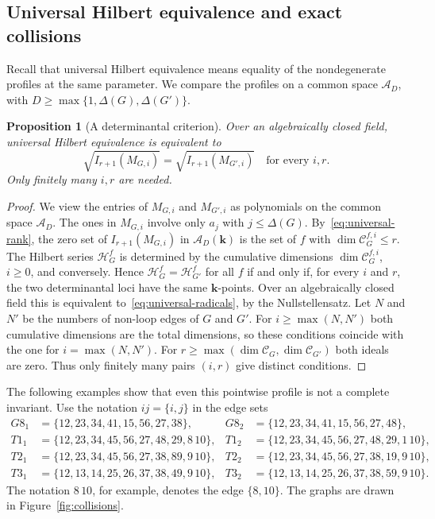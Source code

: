 \documentclass[reqno]{article}
\theoremstyle{plain} %
\newtheorem{proposition}[theorem]{Proposition}
\theoremstyle{definition}
\theoremstyle{remark}
\newcommand{\K} {\mathbf{k}}
\newcommand {\CC}{\mathscr{C}}
\newcommand{\cA}{{\mathscr{A}}}
\newcommand{\hs}{\mathscr{H}}
\numberwithin{equation}{section}
\begin{document}
\subsection{Universal Hilbert equivalence and exact collisions}
\label{sec:universal-collisions}

Recall that universal Hilbert equivalence means equality of the
nondegenerate profiles at the same parameter. We compare the profiles
on a common space $\cA_D$, with
$D\ge\max\{1,\Delta(G),\Delta(G')\}$.

\begin{proposition}[A determinantal criterion]\label{prop:universal-minors}
Over an algebraically closed field, universal Hilbert equivalence is
equivalent to
\begin{equation}\label{eq:universal-radicals}
\sqrt{I_{r+1}(M_{G,i})}=\sqrt{I_{r+1}(M_{G',i})}
\quad\text{for every }i,r.
\end{equation}
Only finitely many $i,r$ are needed.
\end{proposition}
\begin{proof}
We view the entries of $M_{G,i}$ and $M_{G',i}$ as polynomials on the common space $\cA_D$. The ones in $M_{G,i}$ involve only $a_j$ with
$j\le\Delta(G)$. By~\eqref{eq:universal-rank}, the zero set of
$I_{r+1}(M_{G,i})$ in $\cA_D(\K)$ is the set of $f$ with
$\dim\CC_G^{f,i}\le r$. The Hilbert series $\hs^f_G$ is determined by
the cumulative dimensions $\dim\CC_G^{f,i}$, $i\ge0$, and conversely.
Hence $\hs_G^f=\hs_{G'}^f$ for all $f$ if and only if, for every $i$
and $r$, the two determinantal loci have the same $\K$-points. Over an
algebraically closed field this is equivalent to~\eqref{eq:universal-radicals},
by the Nullstellensatz. Let $N$ and $N'$ be the numbers of non-loop edges of $G$ and $G'$.
For $i\ge\max(N,N')$ both cumulative dimensions are the total
dimensions, so these conditions coincide with the one for
$i=\max(N,N')$. For $r\ge\max(\dim\CC_G,\dim\CC_{G'})$ both ideals are
zero. Thus only finitely many pairs $(i,r)$ give distinct conditions.
\end{proof}

The following examples show that even this pointwise profile is not a
complete invariant. Use the notation $ij=\{i,j\}$ in the edge sets
\begin{equation}\label{eq:collision-edge-lists}
\begin{aligned}
G8_1&=\{12,23,34,41,15,56,27,38\},&
G8_2&=\{12,23,34,41,15,56,27,48\},\\
T1_1&=\{12,23,34,45,56,27,48,29,8\,10\},&
T1_2&=\{12,23,34,45,56,27,48,29,1\,10\},\\
T2_1&=\{12,23,34,45,56,27,38,89,9\,10\},&
T2_2&=\{12,23,34,45,56,27,38,19,9\,10\},\\
T3_1&=\{12,13,14,25,26,37,38,49,9\,10\},&
T3_2&=\{12,13,14,25,26,37,38,59,9\,10\}.
\end{aligned}
\end{equation}
The notation $8\,10$, for example, denotes the edge $\{8,10\}$.
The graphs are drawn in Figure~\ref{fig:collisions}.
\end{document}
